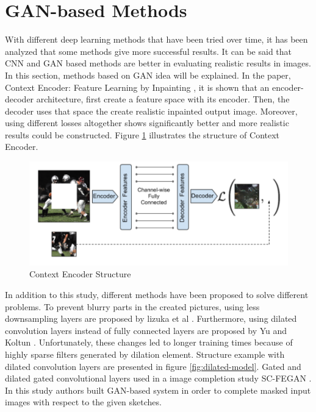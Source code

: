 \section{GAN-based Methods}

With different deep learning methods that have been tried over time, it has been analyzed that some methods give more successful results. It can be said that CNN and GAN based methods are better in evaluating realistic results in images. In this section, methods based on GAN idea will be explained. \newline
In the paper, Context Encoder: Feature Learning by Inpainting \cite{context_encoders}, it is shown that an encoder-decoder architecture, first create a feature space with its encoder. Then, the decoder uses that space the create realistic inpainted output image. Moreover, using different losses altogether shows significantly better and more realistic results could be constructed. Figure \ref{fig:context-encoder} illustrates the structure of Context Encoder.

\begin{figure}[h]
    \centering
    \includegraphics[scale=0.5]{figures/chapter4/context-encoder-example.png}
    \caption{Context Encoder Structure \cite{context_encoders}}
    \label{fig:context-encoder}
\end{figure}

In addition to this study, different methods have been proposed to solve different problems. To prevent blurry parts in the created pictures, using less downsampling layers are proposed by lizuka et al \cite{Iizuka2017}. Furthermore, using dilated convolution layers instead of fully connected layers are proposed by Yu and Koltun \cite{dilated_conv}. Unfortunately, these changes led to longer training times because of highly sparse filters generated by dilation element. Structure example with dilated convolution layers are presented in figure \ref{fig:dilated-model}. Gated and dilated gated convolutional layers used in a image completion study SC-FEGAN \cite{scfegan}. In this study authors built GAN-based system in order to complete masked input images with respect to the given sketches.

